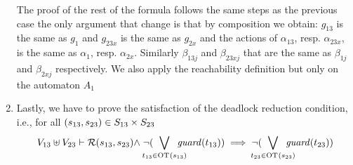 \documentclass[runningheads]{llncs}
\begin{document}
\begin{enumerate}
The proof of the rest of the formula follows the same steps as the previous case the only argument that change is that by composition we obtain:  $g_{13} $ is the same as $ g_1$ and $g_{23x}$  is the same as $g_{2x}$ and the actions of $\alpha_{13}$, resp. $\alpha_{23x}$, is the same as  $\alpha_{1}$, resp. $\alpha_{2x}$. Similarly $\beta_{13j}$ and $\beta_{23xj}$ that are the same as $\beta_{1j}$ and $\beta_{2xj}$ respectively.
 We also apply the reachability definition but only on the automaton $A_1$

%
%	
%



\item Lastly, we have to prove the satisfaction of the deadlock reduction condition, i.e., for all ${\left(s_{13}, s_{23}\right)} \in S_{13} \times S_{23}$
\begin{multline*}
V_{13} \uplus V_{23}  \vdash  \mathcal{R}\mpar{s_{13}, s_{23}} \nwedge  \neg(\bigvee_\subbox{t_{13} \in \fOT{s_{13}}} \fguard{t_{13}}) \implies   \neg (\bigvee_\subbox{t_{23} \in \fOT{s_{23}}} \fguard{t_{23}}) 
\end{multline*}


\end{enumerate}
\end{document}
